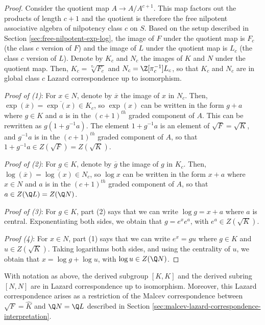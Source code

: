 \documentclass{ucetd}
\begin{document}
\begin{proof}
  Consider the quotient map $A \to A/A^{c+1}$. This map factors out
  the products of length $c + 1$ and the quotient is therefore the
  free nilpotent associative algebra of nilpotency class $c$ on
  $S$. Based on the setup described in Section
  \ref{sec:free-nilpotent-exp-log}, the image of $F$ under the
  quotient map is $F_c$ (the class $c$ version of $F$) and the image
  of $L$ under the quotient map is $L_c$ (the class $c$ version of
  $L$). Denote by $K_c$ and $N_c$ the images of $K$ and $N$ under the
  quotient map. Then, $K_c = \sqrt[\pi_c]{F_c}$ and $N_c =
  \Z[\pi_c^{-1}]L_c$, so that $K_c$ and $N_c$ are in global class $c$
  Lazard correspondence up to isomorphism.

  {\em Proof of (1)}: For $x \in N$, denote by $\overline{x}$ the
  image of $x$ in $N_c$. Then, $\exp(\overline{x}) =
  \overline{\exp(x)} \in K_c$, so $\exp(x)$ can be written in the form
  $g + a$ where $g \in K$ and $a$ is in the $(c+1)^{th}$ graded
  component of $A$. This can be rewritten as $g(1 + g^{-1}a)$. The
  element $1 + g^{-1}a$ is an element of $\sqrt{F} = \sqrt{K}$, and
  $g^{-1}a$ is in the $(c+1)^{th}$ graded component of $A$, so that $1
  + g^{-1}a \in Z(\sqrt{F}) = Z(\sqrt{K})$.

  {\em Proof of (2)}: For $g \in K$, denote by $\overline{g}$ the
  image of $g$ in $K_c$. Then, $\log(\overline{x}) =
  \overline{\log(x)} \in N_c$, so $\log x$ can be written in the form
  $x + a$ where $x \in N$ and $a$ is in the $(c+1)^{th}$ graded
  component of $A$, so that $a \in Z(\Q L) = Z(\Q N)$.

  {\em Proof of (3)}: For $g \in K$, part (2) says that we can write
  $\log g = x +a$ where $a$ is central. Exponentiating both sides, we
  obtain that $g = e^xe^a$, with $e^a \in Z(\sqrt{K})$.

 {\em Proof (4)}: For $x \in N$, part (1) says that we can write $e^x
 = gu$ where $g \in K$ and $u \in Z(\sqrt{K})$. Taking logarithms both
 sides, and using the centrality of $u$, we obtain that $x = \log g +
 \log u$, with $\log u \in Z(\Q N)$.
\end{proof} 

\begin{theorem}\label{thm:lazard-correspondence-derived}
  With notation as above, the derived subgroup $[K,K]$ and the derived
  subring $[N,N]$ are in Lazard correspondence up to
  isomorphism. Moreover, this Lazard correspondence arises as a
  restriction of the Malcev correspondence between $\sqrt{F} =
  \hat{K}$ and $\Q N = \Q L$ described in Section
  \ref{sec:malcev-lazard-correspondence-interpretation}.
\end{theorem}
\end{document}
